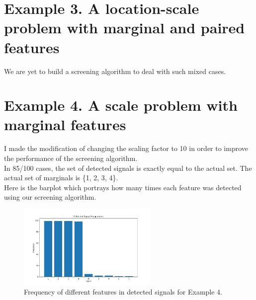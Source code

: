 \documentclass[12pt]{article}
\begin{document}
\section{Example 3. A location-scale problem with marginal and paired features}
We are yet to build a screening algorithm to deal with such mixed cases.

\section{Example 4. A scale problem with marginal features}
I made the modification of changing the scaling factor to 10 in order to improve the performance of the screening algorithm.\\
In 85/100 cases, the set of detected signals is exactly equal to the actual set. The actual set of marginals is \{1, 2, 3, 4\}.\\
Here is the barplot which portrays how many times each feature was detected using our screening algorithm.
\begin{figure}[H]
    \centering
    \includegraphics[width=0.6\textwidth]{eg4.png}
    \caption{Frequency of different features in detected signals for Example 4.}
\end{figure}
\end{document}
